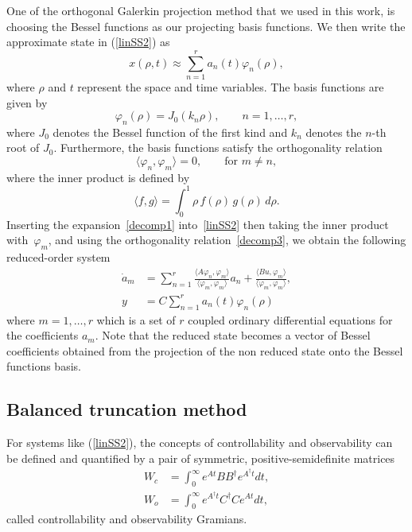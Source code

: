 \documentclass[12pt,lot, lof]{puthesis}
\begin{document}
One of the orthogonal Galerkin projection method that we used in this work, is choosing the Bessel functions as our projecting basis functions. We then write the approximate state in (\ref{linSS2}) as
\begin{equation}
x(\rho,t)  \approx \sum_{n=1}^{r} a_n (t) \varphi_n(\rho),
\label{decomp1}
\end{equation}
where $\rho$ and $t$ represent the space and time variables. The basis functions are given by
\begin{equation}
  \label{decomp2}
  \varphi_n(\rho) = J_0(k_n\rho),\qquad n=1,\ldots,r,
\end{equation}
where $J_0$ denotes the Bessel function of the first kind and $k_n$ denotes the $n$-th root of $J_0$. Furthermore, the basis functions satisfy the orthogonality relation
\begin{equation}
  \label{decomp3}
  \langle \varphi_n,\varphi_m\rangle = 0,\qquad \text{for $m\ne n$},
\end{equation}
where the inner product is defined by
\begin{equation}
\langle f,g \rangle =   \int^1 _0 \rho \, f(\rho) \, g(\rho) \, d\rho.
\end{equation}
 Inserting the expansion~\eqref{decomp1} into~\eqref{linSS2} then taking the inner product with~$\varphi_m$, and using the orthogonality relation~\eqref{decomp3}, we obtain the following reduced-order system
% 
\begin{equation}
\begin{aligned}
  \dot a_m &= \sum_{n=1}^r \frac{\langle A  \varphi_n,  \varphi_m\rangle}{\langle \varphi_m,\varphi_m\rangle} a_n +\frac{ \langle B u,\varphi_m\rangle}{\langle \varphi_m,\varphi_m\rangle} ,\\
    y &= C \sum_{n=1}^{r} a_n (t) \varphi_n(\rho)
\end{aligned}
\end{equation}
where $ m=1,\ldots,r$ which is a set of $r$ coupled ordinary differential equations for the coefficients $a_m$. Note that the reduced state becomes a vector of Bessel coefficients obtained from the projection of the non reduced state onto the Bessel functions basis.


\subsection{Balanced truncation method}
\label{baltrun}

For systems like (\ref{linSS2}), the concepts of controllability and observability can be defined and quantified by a pair of symmetric, positive-semidefinite matrices
\begin{subequations}
\begin{align}
W_c  &= \int_0 ^{\infty} e^{At} B B^{\dagger}  e^{A^{\dagger}t} dt, \\
W_o  &= \int_0 ^{\infty} e^{A^\dagger t}  C^\dagger C  e^{At} dt, 
\end{align}
\label{obscontr}
\end{subequations}
called controllability and observability Gramians.
\end{document}
